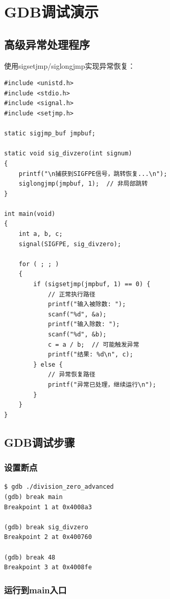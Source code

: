 \documentclass[UTF8,a4paper,12pt]{ctexart}
\begin{document}
\newpage

\section{GDB调试演示}

\subsection{高级异常处理程序}

使用sigsetjmp/siglongjmp实现异常恢复：

\begin{lstlisting}[style=cstyle,caption={division\_zero\_advanced.c}]
#include <unistd.h>
#include <stdio.h>
#include <signal.h>
#include <setjmp.h>

static sigjmp_buf jmpbuf;

static void sig_divzero(int signum)
{
    printf("\n捕获到SIGFPE信号，跳转恢复...\n");
    siglongjmp(jmpbuf, 1);  // 非局部跳转
}

int main(void)
{
    int a, b, c;
    signal(SIGFPE, sig_divzero);

    for ( ; ; )
    {
        if (sigsetjmp(jmpbuf, 1) == 0) {
            // 正常执行路径
            printf("输入被除数: ");
            scanf("%d", &a);
            printf("输入除数: ");
            scanf("%d", &b);
            c = a / b;  // 可能触发异常
            printf("结果: %d\n", c);
        } else {
            // 异常恢复路径
            printf("异常已处理，继续运行\n");
        }
    }
}
\end{lstlisting}

\subsection{GDB调试步骤}

\subsubsection{设置断点}

\begin{lstlisting}[style=bashstyle,caption={GDB设置断点}]
$ gdb ./division_zero_advanced
(gdb) break main
Breakpoint 1 at 0x4008a3

(gdb) break sig_divzero
Breakpoint 2 at 0x400760

(gdb) break 48
Breakpoint 3 at 0x4008fe
\end{lstlisting}

\subsubsection{运行到main入口}
\end{document}
